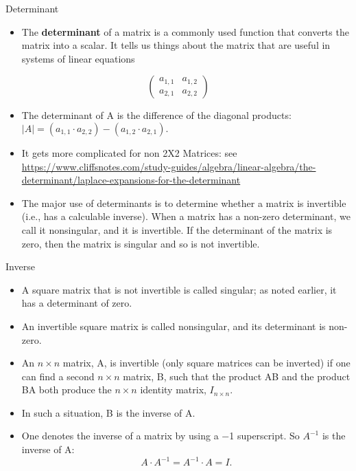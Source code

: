 \documentclass[
  ignorenonframetext,
]{beamer}
\providecommand{\tightlist}{%
  \setlength{\itemsep}{0pt}\setlength{\parskip}{0pt}}
\begin{document}
\begin{frame}{Determinant}
\protect\hypertarget{determinant}{}

\begin{itemize}
\tightlist
\item
  The \textbf{determinant} of a matrix is a commonly used function that
  converts the matrix into a scalar. It tells us things about the matrix
  that are useful in systems of linear equations
\end{itemize}

\[\begin{pmatrix}
  a_{1,1} & a_{1,2}  \\
  a_{2,1} & a_{2,2}
\end{pmatrix}\]

\begin{itemize}
\item
  The determinant of A is the difference of the diagonal products:
  \(|A| = (a_{1,1} · a_{2,2}) − (a_{1,2} · a_{2,1}).\)
\item
  It gets more complicated for non 2X2 Matrices: see
  \url{https://www.cliffsnotes.com/study-guides/algebra/linear-algebra/the-determinant/laplace-expansions-for-the-determinant}
\item
  The major use of determinants is to determine whether a matrix is
  invertible (i.e., has a calculable inverse). When a matrix has a
  non-zero determinant, we call it nonsingular, and it is invertible. If
  the determinant of the matrix is zero, then the matrix is singular and
  so is not invertible.
\end{itemize}

\end{frame}

\begin{frame}{Inverse}
\protect\hypertarget{inverse}{}

\begin{itemize}
\item
  A square matrix that is not invertible is called singular; as noted
  earlier, it has a determinant of zero.
\item
  An invertible square matrix is called nonsingular, and its determinant
  is non-zero.
\item
  An \(n × n\) matrix, A, is invertible (only square matrices can be
  inverted) if one can find a second \(n × n\) matrix, B, such that the
  product AB and the product BA both produce the \(n × n\) identity
  matrix, \(I_{n×n}\).
\item
  In such a situation, B is the inverse of A.
\item
  One denotes the inverse of a matrix by using a −1 superscript. So
  \(A^{−1}\) is the inverse of A: \[A · A^{−1} = A^{−1} · A = I.\]
\end{itemize}

\end{frame}
\end{document}
